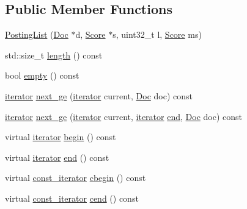 \subsection*{Public Member Functions}
\begin{DoxyCompactItemize}
\item 
\hyperlink{classbloodhound_1_1PostingList_a725f1df76c8278f1d927fff3ed4c496e}{Posting\+List} (\hyperlink{structbloodhound_1_1Doc}{Doc} $\ast$d, \hyperlink{structbloodhound_1_1Score}{Score} $\ast$s, uint32\+\_\+t l, \hyperlink{structbloodhound_1_1Score}{Score} ms)
\item 
std\+::size\+\_\+t \hyperlink{classbloodhound_1_1PostingList_a7af6f4e9fc277dd7c1dc73c2922ceacd}{length} () const
\item 
bool \hyperlink{classbloodhound_1_1PostingList_a28ec60331aec6acaa9c281d4d412bf26}{empty} () const
\item 
\hyperlink{structbloodhound_1_1PostingList_1_1iterator}{iterator} \hyperlink{classbloodhound_1_1PostingList_abd082192a0339062d318de73c95f1ee5}{next\+\_\+ge} (\hyperlink{structbloodhound_1_1PostingList_1_1iterator}{iterator} current, \hyperlink{structbloodhound_1_1Doc}{Doc} doc) const
\item 
\hyperlink{structbloodhound_1_1PostingList_1_1iterator}{iterator} \hyperlink{classbloodhound_1_1PostingList_aae5c35208d6fb36f611f952ba57add0f}{next\+\_\+ge} (\hyperlink{structbloodhound_1_1PostingList_1_1iterator}{iterator} current, \hyperlink{structbloodhound_1_1PostingList_1_1iterator}{iterator} \hyperlink{classbloodhound_1_1PostingList_a2e1f899bd04ae64e1318494d358ade94}{end}, \hyperlink{structbloodhound_1_1Doc}{Doc} doc) const
\item 
virtual \hyperlink{structbloodhound_1_1PostingList_1_1iterator}{iterator} \hyperlink{classbloodhound_1_1PostingList_a274f57f133cd6763e0d8cc3e00fa1be3}{begin} () const
\item 
virtual \hyperlink{structbloodhound_1_1PostingList_1_1iterator}{iterator} \hyperlink{classbloodhound_1_1PostingList_a2e1f899bd04ae64e1318494d358ade94}{end} () const
\item 
virtual \hyperlink{structbloodhound_1_1PostingList_1_1const__iterator}{const\+\_\+iterator} \hyperlink{classbloodhound_1_1PostingList_a44980317210bfe6c9f7d59dbea1cbd4a}{cbegin} () const
\item 
virtual \hyperlink{structbloodhound_1_1PostingList_1_1const__iterator}{const\+\_\+iterator} \hyperlink{classbloodhound_1_1PostingList_a7eca0ae1f54ddc48757a4fb3c0b885ce}{cend} () const
\item 

\end{DoxyCompactItemize}
